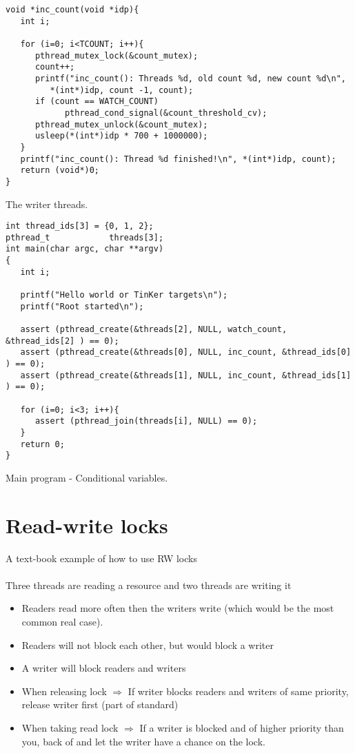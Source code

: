 \begin{table}[!hbp]
\begin{verbatim}
void *inc_count(void *idp){
   int i;

   for (i=0; i<TCOUNT; i++){
      pthread_mutex_lock(&count_mutex);
      count++;
      printf("inc_count(): Threads %d, old count %d, new count %d\n",
         *(int*)idp, count -1, count);
      if (count == WATCH_COUNT)
            pthread_cond_signal(&count_threshold_cv);
      pthread_mutex_unlock(&count_mutex);
      usleep(*(int*)idp * 700 + 1000000);
   }
   printf("inc_count(): Thread %d finished!\n", *(int*)idp, count);
   return (void*)0;
} 
\end{verbatim}
\caption{The writer threads.\label{cond_writer}}
\end{table}

\begin{table}[!hbp]
\begin{verbatim}
int thread_ids[3] = {0, 1, 2};
pthread_t            threads[3]; 
int main(char argc, char **argv)
{ 
   int i;

   printf("Hello world or TinKer targets\n");
   printf("Root started\n");

   assert (pthread_create(&threads[2], NULL, watch_count, &thread_ids[2] ) == 0);
   assert (pthread_create(&threads[0], NULL, inc_count, &thread_ids[0] ) == 0);
   assert (pthread_create(&threads[1], NULL, inc_count, &thread_ids[1] ) == 0);

   for (i=0; i<3; i++){
      assert (pthread_join(threads[i], NULL) == 0);
   }      
   return 0;   
}
\end{verbatim}
\caption{Main program - Conditional variables.\label{cond_main}}
\end{table}

\chapter{Read-write locks}
A text-book example of how to use RW locks
\\\\
Three threads are reading a resource and two threads are writing it

\begin{itemize}
	\item Readers read more often then the writers write (which would be the most common real case).
	\item Readers will not block each other, but would block a writer
	\item A writer will block readers and writers
	\item When releasing lock $\Rightarrow$ If writer blocks readers and writers of same priority, release writer first (part of standard)
	\item When taking read lock $\Rightarrow$ If a writer is blocked and of higher priority than you, back of and let the writer have a chance on the lock.
\end{itemize}

